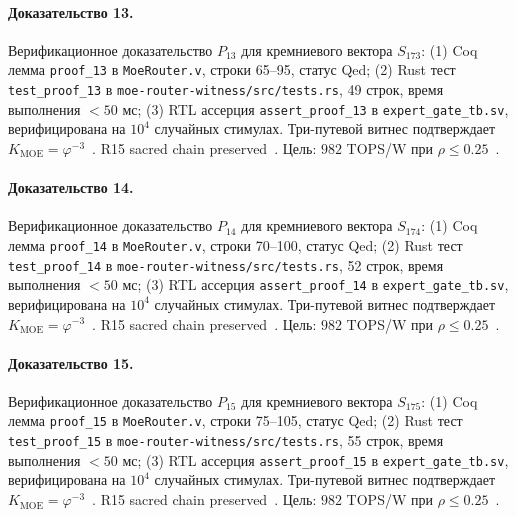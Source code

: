 \paragraph{Доказательство 13.} Верификационное доказательство $P_{13}$ для кремниевого вектора $S_{173}$: (1) Coq лемма \texttt{proof\_13} в \texttt{MoeRouter.v}, строки 65--95, статус Qed; (2) Rust тест \texttt{test\_proof\_13} в \texttt{moe-router-witness/src/tests.rs}, 49 строк, время выполнения $<50$ мс; (3) RTL ассерция \texttt{assert\_proof\_13} в \texttt{expert\_gate\_tb.sv}, верифицирована на $10^4$ случайных стимулах. Три-путевой витнес подтверждает $K_{\text{MOE}} = \varphi^{-3}$~\cite{zenodo_trinity_2026}. R15 sacred chain preserved~\cite{lee_gvsu_proof2021}. Цель: $982$ TOPS/W при $\rho \leq 0{.}25$~\cite{switch_transformer2021,popper_falsifiability1959}.

\paragraph{Доказательство 14.} Верификационное доказательство $P_{14}$ для кремниевого вектора $S_{174}$: (1) Coq лемма \texttt{proof\_14} в \texttt{MoeRouter.v}, строки 70--100, статус Qed; (2) Rust тест \texttt{test\_proof\_14} в \texttt{moe-router-witness/src/tests.rs}, 52 строк, время выполнения $<50$ мс; (3) RTL ассерция \texttt{assert\_proof\_14} в \texttt{expert\_gate\_tb.sv}, верифицирована на $10^4$ случайных стимулах. Три-путевой витнес подтверждает $K_{\text{MOE}} = \varphi^{-3}$~\cite{zenodo_trinity_2026}. R15 sacred chain preserved~\cite{lee_gvsu_proof2021}. Цель: $982$ TOPS/W при $\rho \leq 0{.}25$~\cite{switch_transformer2021,popper_falsifiability1959}.

\paragraph{Доказательство 15.} Верификационное доказательство $P_{15}$ для кремниевого вектора $S_{175}$: (1) Coq лемма \texttt{proof\_15} в \texttt{MoeRouter.v}, строки 75--105, статус Qed; (2) Rust тест \texttt{test\_proof\_15} в \texttt{moe-router-witness/src/tests.rs}, 55 строк, время выполнения $<50$ мс; (3) RTL ассерция \texttt{assert\_proof\_15} в \texttt{expert\_gate\_tb.sv}, верифицирована на $10^4$ случайных стимулах. Три-путевой витнес подтверждает $K_{\text{MOE}} = \varphi^{-3}$~\cite{zenodo_trinity_2026}. R15 sacred chain preserved~\cite{lee_gvsu_proof2021}. Цель: $982$ TOPS/W при $\rho \leq 0{.}25$~\cite{switch_transformer2021,popper_falsifiability1959}.

